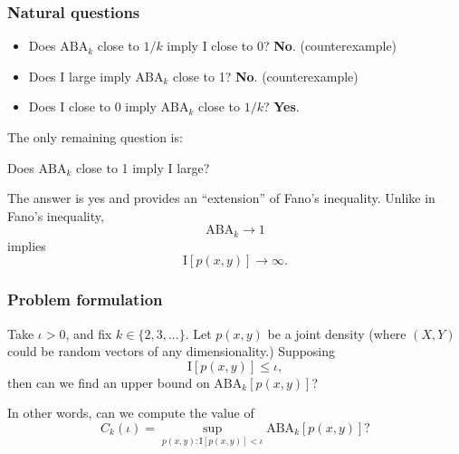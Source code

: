 \documentclass{beamer}
\begin{document}
\begin{frame}
\frametitle{Natural questions}

\begin{itemize}
\item Does $\text{ABA}_k$ close to $1/k$ imply $\text{I}$ close to 0? \textbf{No}. (counterexample)
\item Does $\text{I}$ large imply $\text{ABA}_k$ close to 1?  \textbf{No}. (counterexample)
\item Does $\text{I}$ close to $0$ imply $\text{ABA}_k$ close to $1/k$? \textbf{Yes}.
\end{itemize}

The only remaining question is:
\vspace{0.2in}

Does $\text{ABA}_k$ close to 1 imply $\text{I}$ large?
\vspace{0.2in}

The answer is yes and provides an ``extension'' of Fano's inequality.  Unlike in Fano's inequality,
\[
\text{ABA}_k \to 1
\]
implies
\[
\text{I}[p(x, y)] \to \infty.
\]
\end{frame}

\begin{frame}
\frametitle{Problem formulation} Take $\iota > 0$, and fix $k \in
\{2,3,...\}$.  Let $p(x, y)$ be a joint density (where $(X, Y)$
could be random vectors of any dimensionality.)  Supposing
\[
\text{I}[p(x, y)] \leq \iota,
\]
then can we find an upper bound on $\text{ABA}_k[p(x, y)]$?

In other words, can we compute the value of
\[
C_k(\iota) = \sup_{p(x, y): \text{I}[p(x, y)] < \iota} \text{ABA}_k[p(x, y)]?
\]
\end{frame}
\end{document}
